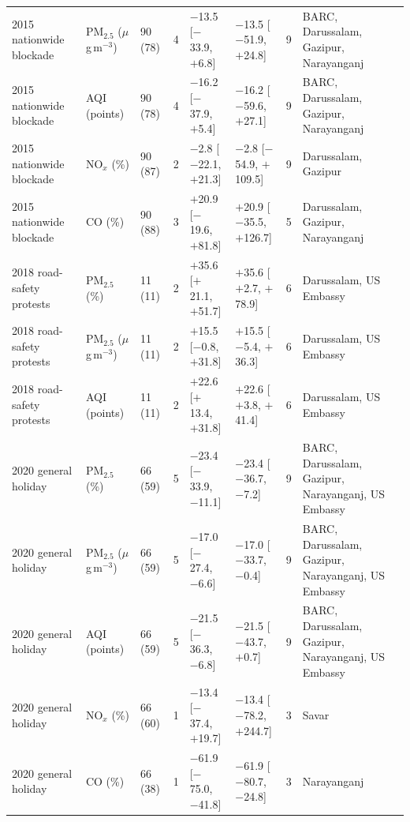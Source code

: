 \begin{longtable}{L{2.6cm} L{2.2cm} C{1.1cm} C{0.4cm} C{2.6cm} C{2.6cm} C{0.7cm} L{2.6cm}}
2015 nationwide blockade & PM$_{2.5}$ ($\mu$g\,m$^{-3}$) & 90 (78) & 4 & $-$13.5 {\scriptsize[$-$33.9, $+$6.8]} & $-$13.5 {\scriptsize[$-$51.9, $+$24.8]} & 9 & BARC, Darussalam, Gazipur, Narayanganj \\
2015 nationwide blockade & AQI (points) & 90 (78) & 4 & $-$16.2 {\scriptsize[$-$37.9, $+$5.4]} & $-$16.2 {\scriptsize[$-$59.6, $+$27.1]} & 9 & BARC, Darussalam, Gazipur, Narayanganj \\
2015 nationwide blockade & NO$_x$ (\%) & 90 (87) & 2 & $-$2.8 {\scriptsize[$-$22.1, $+$21.3]} & $-$2.8 {\scriptsize[$-$54.9, $+$109.5]} & 9 & Darussalam, Gazipur \\
2015 nationwide blockade & CO (\%) & 90 (88) & 3 & $+$20.9 {\scriptsize[$-$19.6, $+$81.8]} & $+$20.9 {\scriptsize[$-$35.5, $+$126.7]} & 5 & Darussalam, Gazipur, Narayanganj \\
2018 road-safety protests & PM$_{2.5}$ (\%) & 11 (11) & 2 & $+$35.6 {\scriptsize[$+$21.1, $+$51.7]} & $+$35.6 {\scriptsize[$+$2.7, $+$78.9]} & 6 & Darussalam, US Embassy \\
2018 road-safety protests & PM$_{2.5}$ ($\mu$g\,m$^{-3}$) & 11 (11) & 2 & $+$15.5 {\scriptsize[$-$0.8, $+$31.8]} & $+$15.5 {\scriptsize[$-$5.4, $+$36.3]} & 6 & Darussalam, US Embassy \\
2018 road-safety protests & AQI (points) & 11 (11) & 2 & $+$22.6 {\scriptsize[$+$13.4, $+$31.8]} & $+$22.6 {\scriptsize[$+$3.8, $+$41.4]} & 6 & Darussalam, US Embassy \\
2020 general holiday & PM$_{2.5}$ (\%) & 66 (59) & 5 & $-$23.4 {\scriptsize[$-$33.9, $-$11.1]} & $-$23.4 {\scriptsize[$-$36.7, $-$7.2]} & 9 & BARC, Darussalam, Gazipur, Narayanganj, US Embassy \\
2020 general holiday & PM$_{2.5}$ ($\mu$g\,m$^{-3}$) & 66 (59) & 5 & $-$17.0 {\scriptsize[$-$27.4, $-$6.6]} & $-$17.0 {\scriptsize[$-$33.7, $-$0.4]} & 9 & BARC, Darussalam, Gazipur, Narayanganj, US Embassy \\
2020 general holiday & AQI (points) & 66 (59) & 5 & $-$21.5 {\scriptsize[$-$36.3, $-$6.8]} & $-$21.5 {\scriptsize[$-$43.7, $+$0.7]} & 9 & BARC, Darussalam, Gazipur, Narayanganj, US Embassy \\
2020 general holiday & NO$_x$ (\%) & 66 (60) & 1 & $-$13.4 {\scriptsize[$-$37.4, $+$19.7]} & $-$13.4 {\scriptsize[$-$78.2, $+$244.7]} & 3 & Savar \\
2020 general holiday & CO (\%) & 66 (38) & 1 & $-$61.9 {\scriptsize[$-$75.0, $-$41.8]} & $-$61.9 {\scriptsize[$-$80.7, $-$24.8]} & 3 & Narayanganj \\

\end{longtable}
